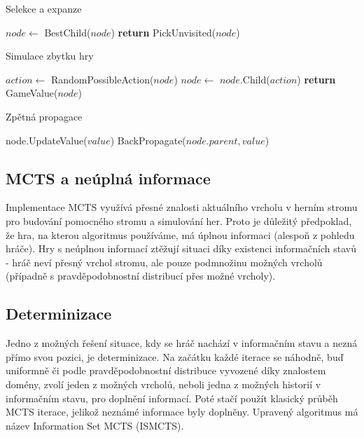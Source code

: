 \begin{algorithm}
\caption{Selekce a expanze}
\begin{algorithmic}[1]
        \State $node \gets$ BestChild($node$)
    \EndWhile
    \State \textbf{return} PickUnvisited($node$)
\EndFunction
\end{algorithmic}
\end{algorithm}

\begin{algorithm}
\caption{Simulace zbytku hry}
\begin{algorithmic}[1]
        \State $action \gets$ RandomPossibleAction($node$)
        \State $node \gets$ $node$.Child($action$)
    \EndWhile
    \State \textbf{return} GameValue($node$)
\EndFunction
\end{algorithmic}
\end{algorithm}

\begin{algorithm}
\caption{Zpětná propagace}
\begin{algorithmic}[1]
    \State node.UpdateValue($value$)
        \State BackPropagate($node.parent, value$)
    \EndIf
\EndFunction
\end{algorithmic}
\end{algorithm}
\clearpage

\subsection{MCTS a neúplná informace}
Implementace MCTS využívá přesné znalosti aktuálního vrcholu v herním stromu pro budování pomocného stromu a simulování her. Proto je důležitý předpoklad, že hra, na kterou algoritmus používáme, má úplnou informaci (alespoň z pohledu hráče). Hry s neúplnou informací ztěžují situaci díky existenci informačních stavů - hráč neví přesný vrchol stromu, ale pouze podmnožinu možných vrcholů (případně s pravděpodobnostní distribucí přes možné vrcholy).

\subsection{Determinizace} \label{subsub:ismcts}
Jedno z možných řešení situace, kdy se hráč nachází v informačním stavu a nezná přímo svou pozici, je determinizace. Na začátku každé iterace se náhodně, buď uniformně či podle pravděpodobnostní distribuce vyvozené díky znalostem domény, zvolí jeden z možných vrcholů, neboli jedna z možných historií v informačním stavu, pro doplnění informací. Poté stačí použít klasický průběh MCTS iterace, jelikož neznámé informace byly doplněny. Upravený algoritmus má název Information Set MCTS (ISMCTS).

